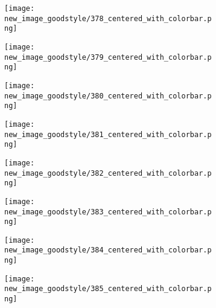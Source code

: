 \documentclass[a4paper,12pt]{article}
\begin{document}
\begin{figure}[H]
  \begin{subfigure}{0.11\textwidth}
    \texttt{[image: new\_image\_goodstyle/378\_centered\_with\_colorbar.png]}
  \end{subfigure}
  \hfill
  \begin{subfigure}{0.11\textwidth}
    \texttt{[image: new\_image\_goodstyle/379\_centered\_with\_colorbar.png]}
  \end{subfigure}
  \hfill
  \begin{subfigure}{0.11\textwidth}
    \texttt{[image: new\_image\_goodstyle/380\_centered\_with\_colorbar.png]}
  \end{subfigure}
  \hfill
  \begin{subfigure}{0.11\textwidth}
    \texttt{[image: new\_image\_goodstyle/381\_centered\_with\_colorbar.png]}
  \end{subfigure}
  \hfill
  \begin{subfigure}{0.11\textwidth}
    \texttt{[image: new\_image\_goodstyle/382\_centered\_with\_colorbar.png]}
  \end{subfigure}
  \hfill
  \begin{subfigure}{0.11\textwidth}
    \texttt{[image: new\_image\_goodstyle/383\_centered\_with\_colorbar.png]}
  \end{subfigure}
  \hfill
  \begin{subfigure}{0.11\textwidth}
    \texttt{[image: new\_image\_goodstyle/384\_centered\_with\_colorbar.png]}
  \end{subfigure}
  \hfill
  \begin{subfigure}{0.11\textwidth}
    \texttt{[image: new\_image\_goodstyle/385\_centered\_with\_colorbar.png]}
  \end{subfigure}
  \hfill
\end{figure}
\end{document}
